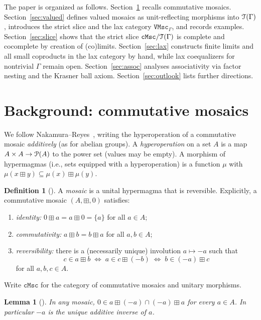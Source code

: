 \documentclass[11pt]{amsart}
\theoremstyle{plain}
\newtheorem{lemma}[theorem]{Lemma}
\theoremstyle{definition}
\newtheorem{definition}[theorem]{Definition}
\theoremstyle{remark}
\newcommand{\eP}{\EuScript{P}}
\newcommand{\T}{\EuScript{T}}
\newcommand{\cMsc}{\mathtt{cMsc}}
\newcommand{\VMscG}{\mathtt{VMsc}_{\Gamma}}
\begin{document}
The paper is organized as follows. Section~\ref{sec:background} recalls commutative mosaics. Section~\ref{sec:valued} defines valued mosaics as unit-reflecting morphisms into \(\T(\Gamma)\), introduces the strict slice and the lax category \(\VMscG\), and records examples. Section~\ref{sec:slice} shows that the strict slice \(\cMsc/\T(\Gamma)\) is complete and cocomplete by creation of (co)limits. Section~\ref{sec:lax} constructs finite limits and all small coproducts in the lax category by hand, while lax coequalizers for nontrivial \(\Gamma\) remain open. Section~\ref{sec:assoc} analyses associativity via factor nesting and the Krasner ball axiom. Section~\ref{sec:outlook} lists further directions.

\section{Background: commutative mosaics}
\label{sec:background}

We follow Nakamura--Reyes~\cite{NR23}, writing the hyperoperation of a commutative mosaic \emph{additively} (as for abelian groups). A \emph{hyperoperation} on a set \(A\) is a map \(A\times A\to\eP(A)\) to the power set (values may be empty). A morphism of hypermagmas (i.e., sets equipped with a hyperoperation) is a function \(\mu\) with \(\mu(x\boxplus y)\subseteq\mu(x)\boxplus\mu(y)\).

\begin{definition}[{\cite[Definition~2.3]{NR23}}]
\label{def:mosaic}
A \emph{mosaic} is a unital hypermagma that is reversible. Explicitly, a commutative mosaic \((A,\boxplus,0)\) satisfies:
\begin{enumerate}[label=(\roman*)]
\item \emph{identity:} \(0\boxplus a=a\boxplus 0=\{a\}\) for all \(a\in A\);
\item \emph{commutativity:} \(a\boxplus b=b\boxplus a\) for all \(a,b\in A\);
\item \emph{reversibility:} there is a (necessarily unique) involution \(a\mapsto -a\) such that
\[
c\in a\boxplus b
\;\iff\;
a\in c\boxplus(-b)
\;\iff\;
b\in(-a)\boxplus c
\]
for all \(a,b,c\in A\).
\end{enumerate}
Write \(\cMsc\) for the category of commutative mosaics and unitary morphisms.
\end{definition}

\begin{lemma}[{\cite[p.~415]{NR23}}]
\label{lem:inv-unit}
In any mosaic, \(0\in a\boxplus(-a)\cap(-a)\boxplus a\) for every \(a\in A\). In particular \(-a\) is the unique additive inverse of \(a\).
\end{lemma}
\end{document}
